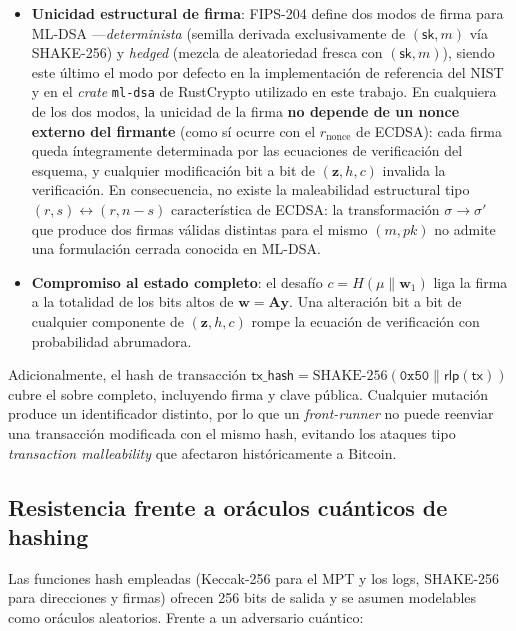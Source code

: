 \begin{itemize}
  \item \textbf{Unicidad estructural de firma}: FIPS-204 define dos modos de firma para ML-DSA ---\emph{determinista} (semilla derivada exclusivamente de $(\textsf{sk}, m)$ vía SHAKE-256) y \emph{hedged} (mezcla de aleatoriedad fresca con $(\textsf{sk}, m)$), siendo este último el modo por defecto en la implementación de referencia del NIST y en el \emph{crate} \texttt{ml-dsa} de RustCrypto utilizado en este trabajo. En cualquiera de los dos modos, la unicidad de la firma \textbf{no depende de un nonce externo del firmante} (como sí ocurre con el $r_{\text{nonce}}$ de ECDSA): cada firma queda íntegramente determinada por las ecuaciones de verificación del esquema, y cualquier modificación bit a bit de $(\mathbf{z}, h, c)$ invalida la verificación. En consecuencia, no existe la maleabilidad estructural tipo $(r,s) \leftrightarrow (r, n{-}s)$ característica de ECDSA: la transformación $\sigma \to \sigma'$ que produce dos firmas válidas distintas para el mismo $(m, \mathit{pk})$ no admite una formulación cerrada conocida en ML-DSA.
  
  \item \textbf{Compromiso al estado completo}: el desafío $c = H(\mu \| \mathbf{w}_1)$ liga la firma a la totalidad de los bits altos de $\mathbf{w} = \mathbf{A}\mathbf{y}$. Una alteración bit a bit de cualquier componente de $(\mathbf{z}, h, c)$ rompe la ecuación de verificación con probabilidad abrumadora.
\end{itemize}

Adicionalmente, el hash de transacción $\textsf{tx\_hash} = \text{SHAKE-256}(\texttt{0x50} \| \textsf{rlp}(\textsf{tx}))$ cubre el sobre completo, incluyendo firma y clave pública. Cualquier mutación produce un identificador distinto, por lo que un \emph{front-runner} no puede reenviar una transacción modificada con el mismo hash, evitando los ataques tipo \emph{transaction malleability} que afectaron históricamente a Bitcoin.

\subsection{Resistencia frente a oráculos cuánticos de hashing}

Las funciones hash empleadas (Keccak-256 para el MPT y los logs, SHAKE-256 para direcciones y firmas) ofrecen 256 bits de salida y se asumen modelables como oráculos aleatorios. Frente a un adversario cuántico:

